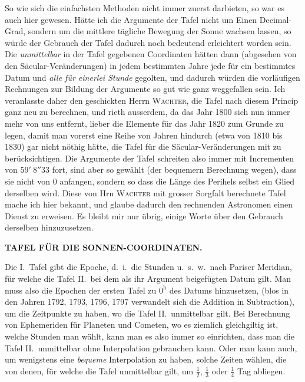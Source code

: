 So wie sich die einfachsten Methoden nicht immer zuerst darbieten, so war es auch hier gewesen. Hätte ich die Argumente der Tafel nicht um Einen Decimal-Grad, sondern um die mittlere tägliche Bewegung der Sonne wachsen lassen, so würde der Gebrauch der Tafel dadurch noch bedeutend erleichtert worden sein. Die \emph{unmittelbar} in der Tafel gegebenen Coordinaten hätten dann (abgesehen von den Säcular-Veränderungen) in jedem bestimmten Jahre jede für ein bestimmtes Datum und \emph{alle für einerlei Stunde} gegolten, und dadurch würden die vorläufigen Rechnungen zur Bildung der Argumente so gut wie ganz weggefallen sein. Ich veranlasste daher den geschickten Herrn \textsc{Wachter}, die Tafel nach diesem Princip ganz neu zu berechnen, und rieth ausserdem, da das Jahr 1800 sich nun immer mehr von uns entfernt, lieber die Elemente für das Jahr 1820 zum Grunde zu legen, damit man vorerst eine Reihe von Jahren hindurch (etwa von 1810 bis 1830) gar nicht nöthig hätte, die Tafel für die Säcular-Veränderungen mit zu berücksichtigen. Die Argumente der Tafel schreiten also immer mit Incrementen von $59'\ 8''33$ fort, sind aber so gewählt (der bequemern Berechnung wegen), dass sie nicht von 0 anfangen, sondern so dass die Länge des Perihels selbst ein Glied derselben wird. Diese von Hrn \textsc{Wachter} mit grosser Sorgfalt berechnete Tafel mache ich hier bekannt, und glaube dadurch den rechnenden Astronomen einen Dienst zu erweisen. Es bleibt mir nur übrig, einige Worte über den Gebrauch derselben hinzuzusetzen.
\par\clearpage
\endgroup
\clearpage
\begingroup
\pagestyle{empty}
\thispagestyle{empty}
\noindent{}%
%
\parbox[t]{\dimexpr\linewidth-24mm\relax}{\centering\footnotesize\bfseries TAFEL FÜR DIE SONNEN-COORDINATEN.\par}%
\makebox[12mm][r]{}\par\nobreak\medskip
\par\indent Die I.\ Tafel gibt die Epoche, d.\ i.\ die Stunden u.\ s.\ w.\ nach Pariser Meridian, für welche die Tafel II.\ bei dem als ihr Argument beigefügten Datum gilt. Man muss also die Epochen der ersten Tafel zu $0^{\mathrm h}$ des Datums hinzusetzen, (blos in den Jahren 1792, 1793, 1796, 1797 verwandelt sich die Addition in Subtraction), um die Zeitpunkte zu haben, wo die Tafel II.\ unmittelbar gilt. Bei Berechnung von Ephemeriden für Planeten und Cometen, wo es ziemlich gleichgiltig ist, welche Stunden man wählt, kann man es also immer so einrichten, dass man die Tafel II.\ unmittelbar ohne Interpolation gebrauchen kann. Oder man kann auch, um wenigstens eine \emph{bequeme} Interpolation zu haben, solche Zeiten wählen, die von denen, für welche die Tafel unmittelbar gilt, um $\frac12$, $\frac13$ oder $\frac14$ Tag abliegen.

